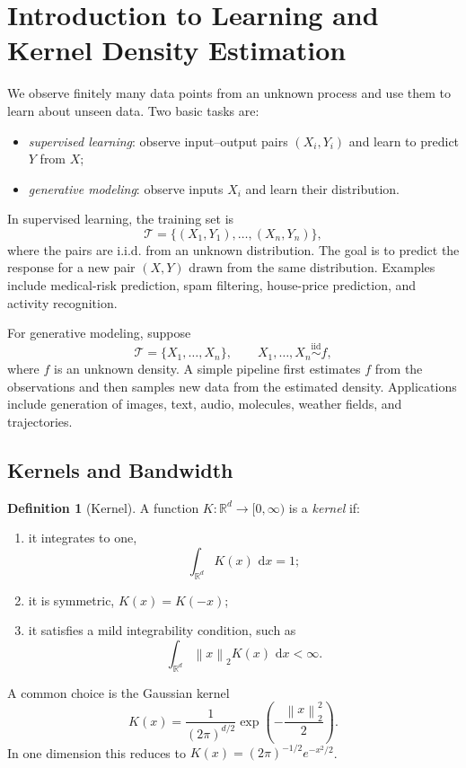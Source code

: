 \documentclass[12pt,oneside]{book}
\numberwithin{equation}{section}
\theoremstyle{definition}
\newtheorem{definition}{Definition}[section]
\theoremstyle{plain}
\theoremstyle{remark}
\newcommand{\R}{\mathbb{R}}
\newcommand{\iid}{\overset{\text{iid}}{\sim}}
\newcommand{\norm}[1]{\left\lVert #1 \right\rVert}
\newcommand{\dd}{\,\mathrm{d}}
\begin{document}
\section{Introduction to Learning and Kernel Density Estimation}
We observe finitely many data points from an unknown process and use them to learn about unseen data. Two basic tasks are:
\begin{itemize}
    \item \emph{supervised learning}: observe input--output pairs $(X_i,Y_i)$ and learn to predict $Y$ from $X$;
    \item \emph{generative modeling}: observe inputs $X_i$ and learn their distribution.
\end{itemize}

In supervised learning, the training set is
\[
\mathcal{T}=\{(X_1,Y_1),\ldots,(X_n,Y_n)\},
\]
where the pairs are i.i.d. from an unknown distribution. The goal is to predict the response for a new pair $(X,Y)$ drawn from the same distribution. Examples include medical-risk prediction, spam filtering, house-price prediction, and activity recognition.

For generative modeling, suppose
\[
\mathcal{T}=\{X_1,\ldots,X_n\},
\qquad
X_1,\ldots,X_n\iid f,
\]
where $f$ is an unknown density. A simple pipeline first estimates $f$ from the observations and then samples new data from the estimated density. Applications include generation of images, text, audio, molecules, weather fields, and trajectories.

\subsection{Kernels and Bandwidth}
\begin{definition}[Kernel]
A function $K\colon\R^d\to[0,\infty)$ is a \emph{kernel} if:
\begin{enumerate}
    \item it integrates to one,
    \[
    \int_{\R^d}K(x)\,\dd x=1;
    \]
    \item it is symmetric, $K(x)=K(-x)$;
    \item it satisfies a mild integrability condition, such as
    \[
    \int_{\R^d}\norm{x}_2K(x)\,\dd x<\infty.
    \]
\end{enumerate}
\end{definition}

A common choice is the Gaussian kernel
\[
K(x)=\frac{1}{(2\pi)^{d/2}}
\exp\left(-\frac{\norm{x}_2^2}{2}\right).
\]
In one dimension this reduces to $K(x)=(2\pi)^{-1/2}e^{-x^2/2}$.
\end{document}

